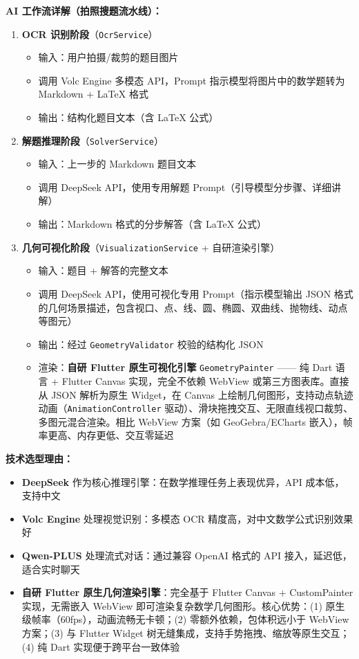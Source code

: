 \documentclass[12pt, a4paper]{ctexart}
\begin{document}
\textbf{AI 工作流详解（拍照搜题流水线）：}
\begin{enumerate}
    \item \textbf{OCR 识别阶段}（\texttt{OcrService}）
    \begin{itemize}
        \item 输入：用户拍摄/裁剪的题目图片
        \item 调用 Volc Engine 多模态 API，Prompt 指示模型将图片中的数学题转为 Markdown + LaTeX 格式
        \item 输出：结构化题目文本（含 LaTeX 公式）
    \end{itemize}
    \item \textbf{解题推理阶段}（\texttt{SolverService}）
    \begin{itemize}
        \item 输入：上一步的 Markdown 题目文本
        \item 调用 DeepSeek API，使用专用解题 Prompt（引导模型分步骤、详细讲解）
        \item 输出：Markdown 格式的分步解答（含 LaTeX 公式）
    \end{itemize}
    \item \textbf{几何可视化阶段}（\texttt{VisualizationService} + 自研渲染引擎）
    \begin{itemize}
        \item 输入：题目 + 解答的完整文本
        \item 调用 DeepSeek API，使用可视化专用 Prompt（指示模型输出 JSON 格式的几何场景描述，包含视口、点、线、圆、椭圆、双曲线、抛物线、动点等图元）
        \item 输出：经过 \texttt{GeometryValidator} 校验的结构化 JSON
        \item 渲染：\textbf{自研 Flutter 原生可视化引擎} \texttt{GeometryPainter} —— 纯 Dart 语言 + Flutter Canvas 实现，完全不依赖 WebView 或第三方图表库。直接从 JSON 解析为原生 Widget，在 Canvas 上绘制几何图形，支持动点轨迹动画（\texttt{AnimationController} 驱动）、滑块拖拽交互、无限直线视口裁剪、多图元混合渲染。相比 WebView 方案（如 GeoGebra/ECharts 嵌入），帧率更高、内存更低、交互零延迟
    \end{itemize}
\end{enumerate}

\textbf{技术选型理由：}
\begin{itemize}
    \item \textbf{DeepSeek} 作为核心推理引擎：在数学推理任务上表现优异，API 成本低，支持中文
    \item \textbf{Volc Engine} 处理视觉识别：多模态 OCR 精度高，对中文数学公式识别效果好
    \item \textbf{Qwen-PLUS} 处理流式对话：通过兼容 OpenAI 格式的 API 接入，延迟低，适合实时聊天
    \item \textbf{自研 Flutter 原生几何渲染引擎}：完全基于 Flutter Canvas + CustomPainter 实现，无需嵌入 WebView 即可渲染复杂数学几何图形。核心优势：(1) 原生级帧率（60fps），动画流畅无卡顿；(2) 零额外依赖，包体积远小于 WebView 方案；(3) 与 Flutter Widget 树无缝集成，支持手势拖拽、缩放等原生交互；(4) 纯 Dart 实现便于跨平台一致体验
\end{itemize}
\end{document}
